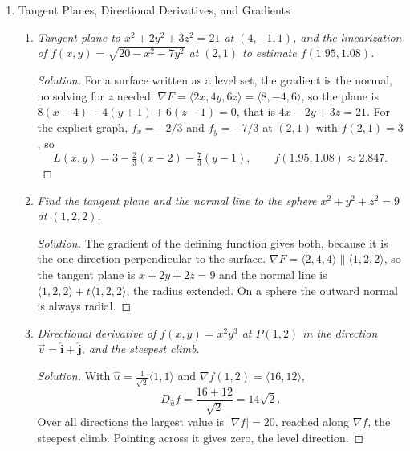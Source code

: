 \documentclass[12pt]{article}
\newcommand{\ihat}{\hat{\mathbf{i}}}
\newcommand{\jhat}{\hat{\mathbf{j}}}
\newenvironment{solution}
  {\renewcommand\qedsymbol{$\blacksquare$}\begin{proof}[Solution]}
  {\end{proof}}
\begin{document}
\begin{enumerate}
\begin{enumerate}
    \begin{solution}
    A right mover plus a left mover. With $\xi=x-at$ and $\eta=x+at$, $u_{tt}=a^2f''(\xi)+a^2g''(\eta)$ and $u_{xx}=f''(\xi)+g''(\eta)$, so $u_{tt}=a^2u_{xx}$. Any shape you like, sent left and right at speed $a$, solves the wave equation.
    \end{solution}

    \end{enumerate}
\newpage

\item Tangent Planes, Directional Derivatives, and Gradients

    \begin{enumerate}
    \item \textit{Tangent plane to $x^2+2y^2+3z^2=21$ at $(4,-1,1)$, and the linearization of $f(x,y)=\sqrt{20-x^2-7y^2}$ at $(2,1)$ to estimate $f(1.95,1.08)$.}

    \begin{solution}
    For a surface written as a level set, the gradient is the normal, no solving for $z$ needed. $\nabla F=\langle2x,4y,6z\rangle=\langle8,-4,6\rangle$, so the plane is $8(x-4)-4(y+1)+6(z-1)=0$, that is $4x-2y+3z=21$. For the explicit graph, $f_x=-2/3$ and $f_y=-7/3$ at $(2,1)$ with $f(2,1)=3$, so
    \[
      L(x,y)=3-\tfrac23(x-2)-\tfrac73(y-1),\qquad f(1.95,1.08)\approx2.847.
    \]
    \end{solution}

    \item \textit{Find the tangent plane and the normal line to the sphere $x^2+y^2+z^2=9$ at $(1,2,2)$.}

    \begin{solution}
    The gradient of the defining function gives both, because it is the one direction perpendicular to the surface. $\nabla F=\langle2,4,4\rangle\parallel\langle1,2,2\rangle$, so the tangent plane is $x+2y+2z=9$ and the normal line is $\langle1,2,2\rangle+t\langle1,2,2\rangle$, the radius extended. On a sphere the outward normal is always radial.
    \end{solution}

    \item \textit{Directional derivative of $f(x,y)=x^2y^3$ at $P(1,2)$ in the direction $\vec v=\ihat+\jhat$, and the steepest climb.}

    \begin{solution}
    With $\hat u=\tfrac{1}{\sqrt2}\langle1,1\rangle$ and $\nabla f(1,2)=\langle16,12\rangle$,
    \[
      D_{\hat u}f=\frac{16+12}{\sqrt2}=14\sqrt2.
    \]
    Over all directions the largest value is $|\nabla f|=20$, reached along $\nabla f$, the steepest climb. Pointing across it gives zero, the level direction.
    \end{solution}


\end{enumerate}
\end{enumerate}
\end{document}
